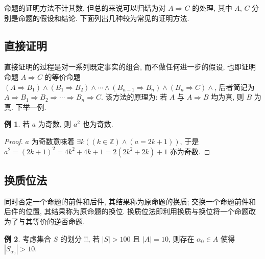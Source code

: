 \documentclass{ctexbook}
\theoremstyle{definition}
\newtheorem{example}{例}[section]
\theoremstyle{remark}
\begin{document}
命题的证明方法不计其数, 但总的来说可以归结为对 $A\Rightarrow{C}$ 的处理, 其中 $A$, $C$ 分别是命题的假设和结论. 下面列出几种较为常见的证明方法.

\subsection{直接证明}

直接证明的过程是对一系列既定事实的组合, 而不做任何进一步的假设, 也即证明命题 $A\Rightarrow{C}$ 的等价命题 $(A\Rightarrow{B_1})\wedge(B_1\Rightarrow{B_2})\wedge\cdots\wedge(B_{n-1}\Rightarrow{B_n})\wedge(B_n\Rightarrow{C})\wedge$, 后者简记为 $A\Rightarrow{B_1}\Rightarrow{B_2}\Rightarrow\cdots\Rightarrow{B_n}\Rightarrow{C}$. 该方法的原理为: 若 $A$ 与 $A\Rightarrow{B}$ 均为真, 则 $B$ 为真. 下举一例.

\begin{example}
    若 $a$ 为奇数, 则 $a^2$ 也为奇数.

    \begin{proof}
        $a$ 为奇数意味着 $\exists{k}\left((k\in\mathbb{Z})\wedge(a=2k+1)\right)$, 于是 $a^2=(2k+1)^2=4k^2+4k+1=2\left(2k^2+2k\right)+1$ 亦为奇数.
    \end{proof}
\end{example}

\subsection{换质位法}

同时否定一个命题的前件和后件, 其结果称为原命题的换质; 交换一个命题前件和后件的位置, 其结果称为原命题的换位. 换质位法即利用换质与换位将一个命题改为了与其等价的逆否命题.

\begin{example}
    考虑集合 $S$ 的划分 $!!$, 若 $|S|>100$ 且 $|A|=10$, 则存在 $\alpha_0\in{A}$ 使得 $\left|S_{\alpha_0}\right|>10$.
\end{example}
\end{document}
